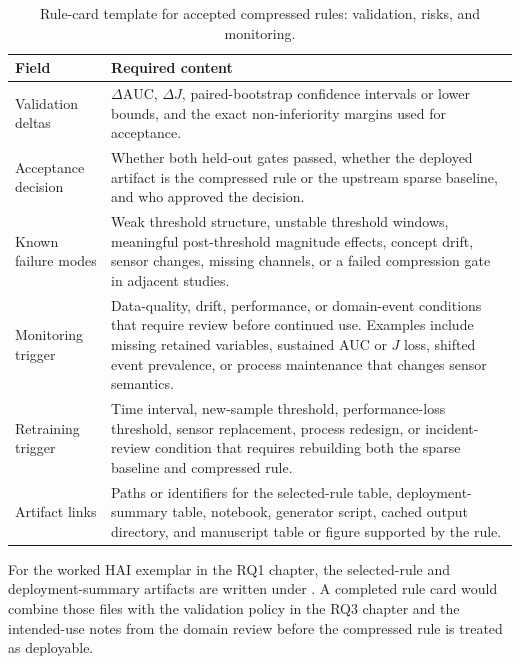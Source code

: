 \begin{table}[p]
    \caption[Rule-card template: validation, risks, and monitoring.]{Rule-card template for accepted compressed rules: validation, risks, and monitoring.}
    \label{tab:rule_card_template_validation}
    \centering
    {
    \setlength{\tabcolsep}{3pt}
    \renewcommand{\arraystretch}{0.97}
    \begin{tabularx}{\textwidth}{>{\RaggedRight\arraybackslash}p{}>{\RaggedRight\arraybackslash}X}
        Field & Required content \\ \hline
        Validation deltas & $\Delta \mathrm{AUC}$, $\Delta J$, paired-bootstrap confidence intervals or lower bounds, and the exact non-inferiority margins used for acceptance. \\ \hline
        Acceptance decision & Whether both held-out gates passed, whether the deployed artifact is the compressed rule or the upstream sparse baseline, and who approved the decision. \\ \hline
        Known failure modes & Weak threshold structure, unstable threshold windows, meaningful post-threshold magnitude effects, concept drift, sensor changes, missing channels, or a failed compression gate in adjacent studies. \\ \hline
        Monitoring trigger & Data-quality, drift, performance, or domain-event conditions that require review before continued use. Examples include missing retained variables, sustained AUC or $J$ loss, shifted event prevalence, or process maintenance that changes sensor semantics. \\ \hline
        Retraining trigger & Time interval, new-sample threshold, performance-loss threshold, sensor replacement, process redesign, or incident-review condition that requires rebuilding both the sparse baseline and compressed rule. \\ \hline
        Artifact links & Paths or identifiers for the selected-rule table, deployment-summary table, notebook, generator script, cached output directory, and manuscript table or figure supported by the rule. \\ \hline
    \end{tabularx}
    }
\end{table}

For the worked HAI exemplar in the RQ1 chapter, the selected-rule and deployment-summary artifacts are written under . A completed rule card would combine those files with the validation policy in the RQ3 chapter and the intended-use notes from the domain review before the compressed rule is treated as deployable.
